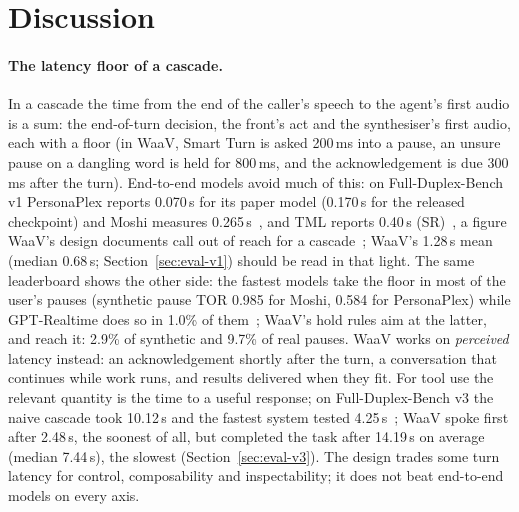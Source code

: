 \section{Discussion}\label{sec:discussion}

\paragraph{The latency floor of a cascade.}
In a cascade the time from the end of the caller's speech to the agent's first audio is a sum: the end-of-turn decision, the
front's act and the synthesiser's first audio, each with a floor (in WaaV, Smart Turn is asked 200\,ms into a pause, an unsure
pause on a dangling word is held for 800\,ms, and the acknowledgement is due 300\,ms after the turn). End-to-end models avoid
much of this: on Full-Duplex-Bench v1 PersonaPlex reports 0.070\,s for its paper model (0.170\,s for the released checkpoint) and Moshi measures 0.265\,s~\citep{fdb_repo,roy2026personaplex},
and TML reports 0.40\,s (SR)~\citep{tml2026interaction}, a figure WaaV's design documents call out of reach for a
cascade~\citep{waav_design}; WaaV's 1.28\,s mean (median 0.68\,s; Section~\ref{sec:eval-v1}) should be read in that light. The
same leaderboard shows the other side: the fastest models take the floor in most of the user's pauses (synthetic pause TOR
0.985 for Moshi, 0.584 for PersonaPlex) while GPT-Realtime does so in 1.0\% of them~\citep{fdb_repo}; WaaV's hold rules aim at
the latter, and reach it: 2.9\% of synthetic and 9.7\% of real pauses. WaaV works on \emph{perceived} latency instead: an acknowledgement shortly after
the turn, a conversation that continues while work runs, and results delivered when they fit. For tool use the relevant
quantity is the time to a useful response; on Full-Duplex-Bench v3 the naive cascade took 10.12\,s and the fastest system
tested 4.25\,s~\citep{lin2026fdbv3}; WaaV spoke first after 2.48\,s, the soonest of all, but completed the task after
14.19\,s on average (median 7.44\,s), the slowest (Section~\ref{sec:eval-v3}). The design trades some turn latency for
control, composability and inspectability; it does not beat end-to-end models on every axis.

